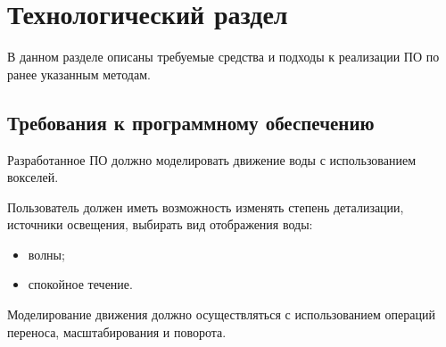 \chapter{Технологический раздел}
\label{cha:impl}

В данном разделе описаны требуемые средства и подходы к реализации ПО по ранее указанным методам.

\section{Требования к программному обеспечению}

Разработанное ПО должно моделировать движение воды с использованием вокселей.

Пользователь должен иметь возможность изменять степень детализации,
источники освещения, выбирать вид отображения воды:
\begin{itemize}
    \item волны;
    \item спокойное течение.
\end{itemize}

Моделирование движения должно осуществляться с использованием операций переноса, масштабирования и поворота.

